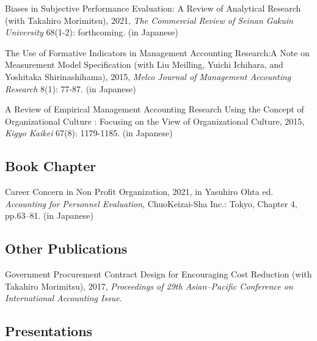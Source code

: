 \documentclass[letterpaper,uplatex]{article}
\renewenvironment{itemize}{
  \begin{list}{}{
    \setlength{\leftmargin}{1.5em}
  }
}{
  \end{list}
}
\begin{document}
\begin{itemize}
    \item Biases in Subjective Performance Evaluation: A Review of Analytical Research (with Takahiro Morimitsu), 2021, \textit{The Commercial Review of Seinan Gakuin University} 68(1-2): forthcoming. (in Japanese)
    
	\item The Use of Formative Indicators in Management Accounting Research:A Note on Measurement Model Specification (with Liu Meilling, Yuichi Ichihara, and Yoshitaka Shirinashihama), 2015, \textit{Melco Journal of Management Accounting Research} 8(1): 77-87. (in Japanese)

	\item A Review of Empirical Management Accounting Research Using the Concept of Organizational Culture : Focusing on the View of Organizational Culture, 2015, \textit{Kigyo Kaikei} 67(8): 1179-1185. (in Japanese)
\end{itemize}


\subsection*{Book Chapter}

\begin{itemize}
	\item Career Concern in Non Profit Organization, 2021, in Yasuhiro Ohta ed. \textit{Accounting for Personnel Evaluation}, ChuoKeizai-Sha Inc.: Tokyo, Chapter 4, pp.63--81. (in Japanese)
\end{itemize}


\subsection*{Other Publications}

\begin{itemize}
	\item Government Procurement Contract Design for Encouraging Cost Reduction (with Takahiro Morimitsu), 2017, \textit{Proceedings of 29th Asian--Pacific Conference on International Accounting Issue}.
\end{itemize}

\subsection*{Presentations}
\end{document}
